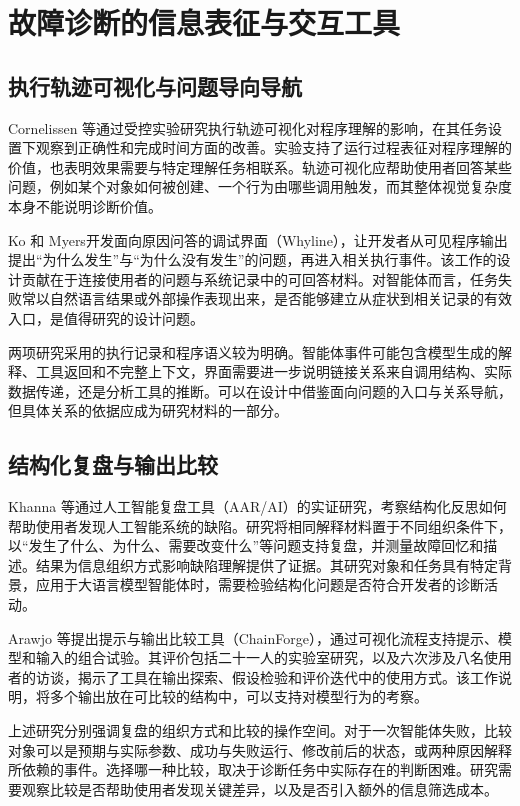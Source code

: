 \section{故障诊断的信息表征与交互工具}

\subsection{执行轨迹可视化与问题导向导航}

Cornelissen 等\cite{ref33}通过受控实验研究执行轨迹可视化对程序理解的影响，在其任务设置下观察到正确性和完成时间方面的改善。实验支持了运行过程表征对程序理解的价值，也表明效果需要与特定理解任务相联系。轨迹可视化应帮助使用者回答某些问题，例如某个对象如何被创建、一个行为由哪些调用触发，而其整体视觉复杂度本身不能说明诊断价值。

Ko 和 Myers\cite{ref07}开发面向原因问答的调试界面（Whyline），让开发者从可见程序输出提出“为什么发生”与“为什么没有发生”的问题，再进入相关执行事件。该工作的设计贡献在于连接使用者的问题与系统记录中的可回答材料。对智能体而言，任务失败常以自然语言结果或外部操作表现出来，是否能够建立从症状到相关记录的有效入口，是值得研究的设计问题。

两项研究采用的执行记录和程序语义较为明确。智能体事件可能包含模型生成的解释、工具返回和不完整上下文，界面需要进一步说明链接关系来自调用结构、实际数据传递，还是分析工具的推断。可以在设计中借鉴面向问题的入口与关系导航，但具体关系的依据应成为研究材料的一部分。

\subsection{结构化复盘与输出比较}

Khanna 等\cite{ref04}通过人工智能复盘工具（AAR/AI）的实证研究，考察结构化反思如何帮助使用者发现人工智能系统的缺陷。研究将相同解释材料置于不同组织条件下，以“发生了什么、为什么、需要改变什么”等问题支持复盘，并测量故障回忆和描述。结果为信息组织方式影响缺陷理解提供了证据。其研究对象和任务具有特定背景，应用于大语言模型智能体时，需要检验结构化问题是否符合开发者的诊断活动。

Arawjo 等\cite{arawjo2024chainforge}提出提示与输出比较工具（ChainForge），通过可视化流程支持提示、模型和输入的组合试验。其评价包括二十一人的实验室研究，以及六次涉及八名使用者的访谈，揭示了工具在输出探索、假设检验和评价迭代中的使用方式。该工作说明，将多个输出放在可比较的结构中，可以支持对模型行为的考察。

上述研究分别强调复盘的组织方式和比较的操作空间。对于一次智能体失败，比较对象可以是预期与实际参数、成功与失败运行、修改前后的状态，或两种原因解释所依赖的事件。选择哪一种比较，取决于诊断任务中实际存在的判断困难。研究需要观察比较是否帮助使用者发现关键差异，以及是否引入额外的信息筛选成本。

